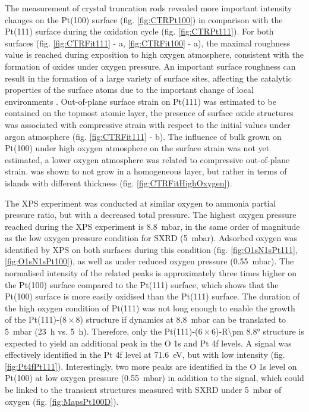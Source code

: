 The measurement of crystal truncation rods revealed more important intensity changes on the Pt(100) surface (fig. \ref{fig:CTRPt100}) in comparison with the Pt(111) surface during the oxidation cycle (fig. \ref{fig:CTRPt111}).
For both surfaces (fig. \ref{fig:CTRFit111} - a, \ref{fig:CTRFit100} - a), the maximal roughness value is reached during exposition to high oxygen atmosphere, consistent with the formation of oxides under oxygen pressure.
An important surface roughness can result in the formation of a large variety of surface sites, affecting the catalytic properties of the surface atoms due to the important change of local environments \parencite{Hendriksen2010, CalleVallejo2014, CalleVallejo2018}.
Out-of-plane surface strain on Pt(111) was estimated to be contained on the topmost atomic layer, the presence of surface oxide structures was associated with compressive strain with respect to the initial values under argon atmosphere (fig. \ref{fig:CTRFit111} - b).
The influence of bulk  grown on Pt(100) under high oxygen atmosphere on the surface strain was not yet estimated, a lower oxygen atmosphere was related to compressive out-of-plane strain.
 was shown to not grow in a homogeneous layer, but rather in terms of islands with different thickness (fig. \ref{fig:CTRFitHighOxygen}).

The XPS experiment was conducted at similar oxygen to ammonia partial pressure ratio, but with a decreased total pressure.
The highest oxygen pressure reached during the XPS experiment is \qty{8.8}{\milli\bar}, in the same order of magnitude as the low oxygen pressure condition for SXRD (\qty{5}{\milli\bar}).
Adsorbed oxygen was identified by XPS on both surfaces during this condition (fig. \ref{fig:O1sN1sPt111}, \ref{fig:O1sN1sPt100}), as well as under reduced oxygen pressure (\qty{0.55}{\milli\bar}).
The normalised intensity of the related peaks is approximately three times higher on the Pt(100) surface compared to the Pt(111) surface, which shows that the Pt(100) surface is more easily oxidised than the Pt(111) surface.
The duration of the high oxygen condition of Pt(111) was not long enough to enable the growth of the Pt(111)-($8\times8$) structure if dynamics at \qty{8.8}{\milli\bar} can be translated to \qty{5}{\milli\bar} (\qty{23}{\hour} vs. \qty{5}{\hour}).
Therefore, only the Pt(111)-($6\times6$)-R\ang{\pm 8.8} structure is expected to yield an additional peak in the O 1s and Pt 4f levels.
A signal was effectively identified in the Pt 4f level at \qty{71.6}{\eV}, but with low intensity (fig. \ref{fig:Pt4fPt111}).
Interestingly, two more peaks are identified in the O 1s level on Pt(100) at low oxygen pressure (\qty{0.55}{\milli\bar}) in addition to the  signal, which could be linked to the transient structures measured with SXRD under \qty{5}{\milli\bar} of oxygen (fig. \ref{fig:MapsPt100D}).

